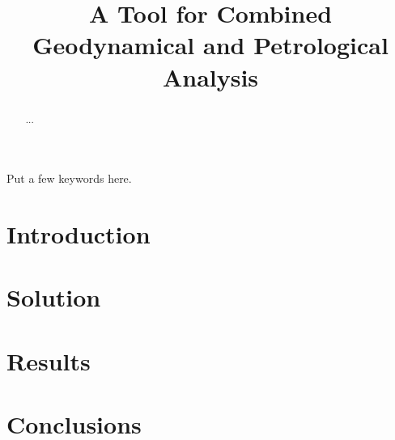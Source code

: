 \documentclass[12pt,a4paper]{article}
\title{A Tool for Combined Geodynamical and Petrological Analysis}
\date{}
\begin{document}
\maketitle

\begin{abstract}
...
\end{abstract}

\begin{keywords}
Put a few keywords here.
\end{keywords}

\section{Introduction}

\section{Solution}
\label{sec:solution}


\section{Results}
\label{sec:results}


\section{Conclusions}

\printbibliography
\end{document}
